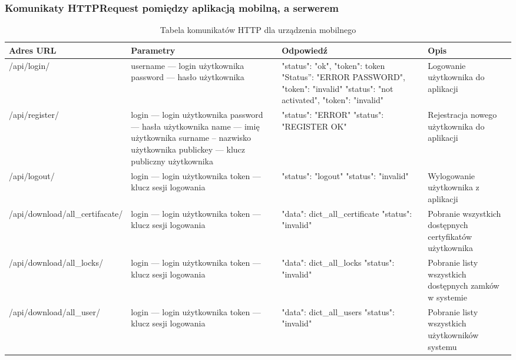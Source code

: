 \begin{landscape}
	\subsubsection{Komunikaty HTTPRequest pomiędzy aplikacją mobilną, \newline a serwerem}
	\begin{longtable}[!ht]{|m{5cm}|m{6cm}|m{6.5cm}|m{3cm}|} 
		\caption{Tabela komunikatów HTTP dla urządzenia mobilnego}
		\label{tab:http_mobilne}\\
		\hline	
		Adres URL & Parametry & Odpowiedź & Opis \\	\hline
		/api/login/ & username --- login użytkownika \newline password --- hasło użytkownika & "status": "ok", "token": token \tablinia "Status'': "ERROR PASSWORD", "token": "invalid" \tablinia "status": "not activated", "token": "invalid" & Logowanie użytkownika do aplikacji \\ \hline
		/api/register/ & login --- login użytkownika \newline password --- hasła użytkownika \newline name --- imię użytkownika \newline surname -- nazwisko użytkownika \newline publickey --- klucz publiczny użytkownika & "status": "ERROR" \tablinia "status": "REGISTER OK" & Rejestracja nowego użytkownika do aplikacji \\ \hline
		/api/logout/ & login --- login użytkownika \newline token --- klucz sesji logowania & "status": "logout" \tablinia "status": "invalid" & Wylogowanie użytkownika z aplikacji \\ \hline
		/api/download/all\_certifacate/ & login --- login użytkownika \newline token --- klucz sesji logowania & "data": dict\_all\_certificate \tablinia "status": "invalid" & Pobranie wszystkich dostępnych certyfikatów użytkownika \\ \hline
		/api/download/all\_locks/ & login --- login użytkownika \newline token --- klucz sesji logowania & "data": dict\_all\_locks \tablinia "status": "invalid" & Pobranie listy wszystkich dostępnych zamków w systemie \\ \hline
		/api/download/all\_user/ & login --- login użytkownika \newline token --- klucz sesji logowania & "data": dict\_all\_users \tablinia "status": "invalid" & Pobranie listy wszystkich użytkowników systemu \\ \hline

\end{longtable}
\end{landscape}
